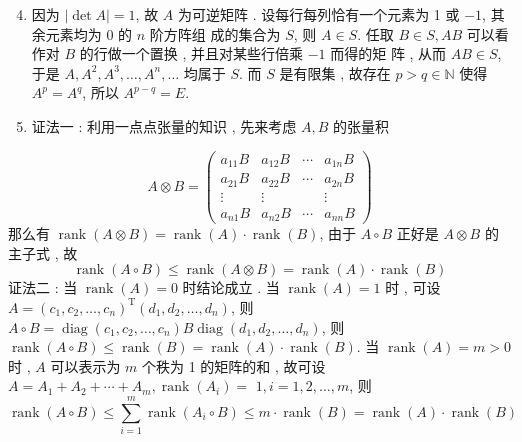 \documentclass[10pt]{article}
\begin{document}
\begin{enumerate}
  \setcounter{enumi}{3}
  \item  因为  $|\operatorname{det} A|=1$,  故  $A$  为可逆矩阵 .  设每行每列恰有一个元素为  1  或  $-1$,  其余元素均为  0  的  $n$  阶方阵组   成的集合为  $S$,  则  $A \in S$.  任取  $B \in S, A B$  可以看作对  $B$  的行做一个置换 ,  并且对某些行倍乘  $-1$  而得的矩   阵 ,  从而  $A B \in S$,  于是  $A, A^{2}, A^{3}, \ldots, A^{n}, \ldots$  均属于  $S$.  而  $S$  是有限集 ,  故存在  $p>q \in \mathbb{N}$  使得  $A^{p}=A^{q}$,  所以  $A^{p-q}=E$.

  \item  证法一 :  利用一点点张量的知识 ,  先来考虑  $A, B$  的张量积 

\end{enumerate}
$$
A \otimes B=\left(\begin{array}{cccc}
a_{11} B & a_{12} B & \cdots & a_{1 n} B \\
a_{21} B & a_{22} B & \cdots & a_{2 n} B \\
\vdots & \vdots & & \vdots \\
a_{n 1} B & a_{n 2} B & \cdots & a_{n n} B
\end{array}\right)
$$
 那么有  $\operatorname{rank}(A \otimes B)=\operatorname{rank}(A) \cdot \operatorname{rank}(B)$,  由于  $A \circ B$  正好是  $A \otimes B$  的主子式 ,  故 
$$
\operatorname{rank}(A \circ B) \leqslant \operatorname{rank}(A \otimes B)=\operatorname{rank}(A) \cdot \operatorname{rank}(B)
$$
 证法二 :  当  $\operatorname{rank}(A)=0$  时结论成立 .  当  $\operatorname{rank}(A)=1$  时 ,  可设  $A=\left(c_{1}, c_{2}, \ldots, c_{n}\right)^{\mathrm{T}}\left(d_{1}, d_{2}, \ldots, d_{n}\right)$,  则  $A \circ B=\operatorname{diag}\left(c_{1}, c_{2}, \ldots, c_{n}\right) B \operatorname{diag}\left(d_{1}, d_{2}, \ldots, d_{n}\right)$,  则  $\operatorname{rank}(A \circ B) \leqslant \operatorname{rank}(B)=\operatorname{rank}(A) \cdot \operatorname{rank}(B)$.  当  $\operatorname{rank}(A)=m>0$  时 , $A$  可以表示为  $m$  个秩为  1  的矩阵的和 ,  故可设  $A=A_{1}+A_{2}+\cdots+A_{m}, \operatorname{rank}\left(A_{i}\right)=$ $1, i=1,2, \ldots, m$,  则 
$$
\operatorname{rank}(A \circ B) \leqslant \sum_{i=1}^{m} \operatorname{rank}\left(A_{i} \circ B\right) \leqslant m \cdot \operatorname{rank}(B)=\operatorname{rank}(A) \cdot \operatorname{rank}(B)
$$
\end{document}
